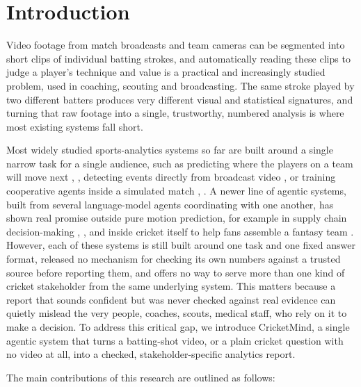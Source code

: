 \section{Introduction}

Video footage from match broadcasts and team cameras can be segmented into short clips of individual batting strokes, and automatically reading these clips to judge a player's technique and value is a practical and increasingly studied problem, used in coaching, scouting and broadcasting. The same stroke played by two different batters produces very different visual and statistical signatures, and turning that raw footage into a single, trustworthy, numbered analysis is where most existing systems fall short.

Most widely studied sports-analytics systems so far are built around a single narrow task for a single audience, such as predicting where the players on a team will move next \cite{ref1}, \cite{ref2}, detecting events directly from broadcast video \cite{ref3}, or training cooperative agents inside a simulated match \cite{ref4}, \cite{ref5}. A newer line of agentic systems, built from several language-model agents coordinating with one another, has shown real promise outside pure motion prediction, for example in supply chain decision-making \cite{ref6}, \cite{ref7}, and inside cricket itself to help fans assemble a fantasy team \cite{ref8}. However, each of these systems is still built around one task and one fixed answer format, released no mechanism for checking its own numbers against a trusted source before reporting them, and offers no way to serve more than one kind of cricket stakeholder from the same underlying system. This matters because a report that sounds confident but was never checked against real evidence can quietly mislead the very people, coaches, scouts, medical staff, who rely on it to make a decision. To address this critical gap, we introduce CricketMind, a single agentic system that turns a batting-shot video, or a plain cricket question with no video at all, into a checked, stakeholder-specific analytics report.

The main contributions of this research are outlined as follows:

